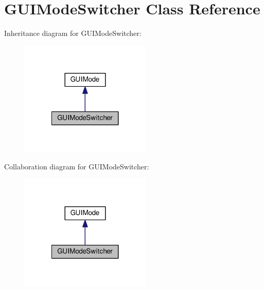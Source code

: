 \hypertarget{classGUIModeSwitcher}{\section{G\-U\-I\-Mode\-Switcher Class Reference}
\label{classGUIModeSwitcher}
}


Inheritance diagram for G\-U\-I\-Mode\-Switcher\-:
\nopagebreak
\begin{figure}[H]
\begin{center}
\leavevmode
\includegraphics[width=176pt]{classGUIModeSwitcher__inherit__graph}
\end{center}
\end{figure}


Collaboration diagram for G\-U\-I\-Mode\-Switcher\-:
\nopagebreak
\begin{figure}[H]
\begin{center}
\leavevmode
\includegraphics[width=176pt]{classGUIModeSwitcher__coll__graph}
\end{center}
\end{figure}
